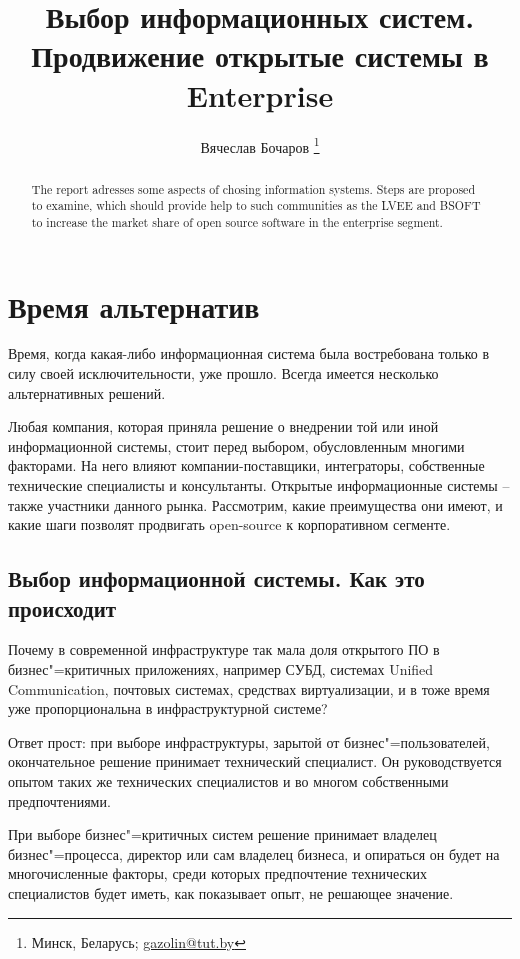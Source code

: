 \documentclass[10pt, a5paper]{article}
\begin{document}
\title{Выбор информационных систем. Продвижение открытые системы в Enterprise}
\author{Вячеслав Бочаров \footnote{Минск, Беларусь; \url{gazolin@tut.by}}}
\maketitle
\begin{abstract}
The report adresses some aspects of chosing information systems. Steps are proposed to examine, which should provide help to such communities as the LVEE and BSOFT to increase the market share of open source software in the enterprise segment.
\end{abstract}
\section*{Время альтернатив}

Время, когда какая-либо информационная система была востребована только в силу своей исключительности, уже прошло. 
Всегда имеется несколько альтернативных решений.

Любая компания, которая приняла решение о внедрении той или иной информационной системы, стоит перед выбором, обусловленным многими факторами. На него влияют компании-поставщики, интеграторы, собственные технические специалисты и консультанты.
Открытые информационные системы -- также участники данного рынка. Рассмотрим, какие преимущества они имеют, и какие шаги позволят продвигать open-source  к корпоративном сегменте.

\subsection*{Выбор информационной системы. Как это происходит}

Почему в современной инфраструктуре так мала доля открытого ПО в бизнес"=критичных приложениях, например СУБД, системах Unified Communication, почтовых системах, средствах виртуализации, и в тоже время уже пропорциональна в инфраструктурной системе?

Ответ прост: при выборе инфраструктуры, зарытой от бизнес"=пользователей, окончательное решение принимает технический специалист. Он руководствуется опытом таких же технических специалистов и во многом собственными предпочтениями.

При выборе бизнес"=критичных систем решение принимает владелец бизнес"=процесса, директор или сам владелец бизнеса, и опираться он будет на многочисленные факторы, среди которых предпочтение технических специалистов будет иметь, как показывает опыт, не решающее значение.
\end{document}
